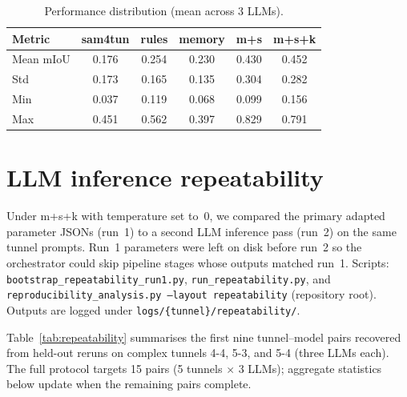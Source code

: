 \begin{table}[ht]
\caption{Performance distribution (mean across 3 LLMs).}\label{tab:distribution}
\begin{tabular*}{\tblwidth}{@{} l c c c c c @{}}
\toprule
Metric & sam4tun & rules & memory & m+s & m+s+k \\
\midrule
Mean mIoU & 0.176 & 0.254 & 0.230 & 0.430 & 0.452 \\
Std & 0.173 & 0.165 & 0.135 & 0.304 & 0.282 \\
Min & 0.037 & 0.119 & 0.068 & 0.099 & 0.156 \\
Max & 0.451 & 0.562 & 0.397 & 0.829 & 0.791 \\
\bottomrule
\end{tabular*}
\end{table}

\section{LLM inference repeatability}\label{app:repeatability}

Under m+s+k with temperature set to~0, we compared the primary adapted parameter JSONs (run~1) to a second LLM inference pass (run~2) on the same tunnel prompts. Run~1 parameters were left on disk before run~2 so the orchestrator could skip pipeline stages whose outputs matched run~1. Scripts: \texttt{bootstrap\_repeatability\_run1.py}, \texttt{run\_repeatability.py}, and \texttt{reproducibility\_analysis.py --layout repeatability} (repository root). Outputs are logged under \texttt{logs/\{tunnel\}/repeatability/}.

Table~\ref{tab:repeatability} summarises the first nine tunnel--model pairs recovered from held-out reruns on complex tunnels 4-4, 5-3, and 5-4 (three LLMs each). The full protocol targets 15 pairs (5 tunnels $\times$ 3 LLMs); aggregate statistics below update when the remaining pairs complete.

